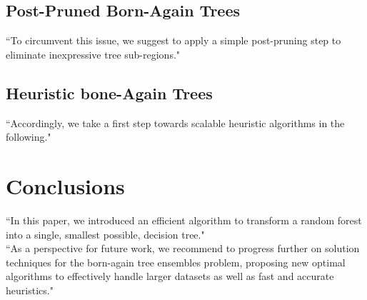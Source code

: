 \documentclass[11pt]{article}
\begin{document}
\subsection{Post-Pruned Born-Again Trees}
``To circumvent this issue, we suggest to apply a simple post-pruning step to eliminate inexpressive tree sub-regions."
\subsection{Heuristic bone-Again Trees}
``Accordingly, we take a first step towards scalable heuristic algorithms in the following."


\section{Conclusions}
``In this paper, we introduced an efficient algorithm to transform a random forest into a single, smallest possible, decision tree."\\
``As a perspective for future work, we recommend to progress further on solution techniques for the born-again tree ensembles problem, proposing new optimal algorithms to effectively handle larger datasets as well as fast and accurate heuristics."


\vskip 0.2in



\end{document}

